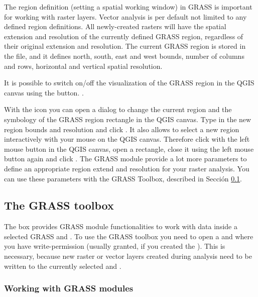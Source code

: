 The region definition (setting a spatial working window) in GRASS is important 
for working with raster layers. Vector analysis is per default not limited
to any defined region definitions. All newly-created rasters will have the
spatial extension and resolution of the currently defined GRASS region,
regardless of their original extension and resolution. The current GRASS
region is stored in the  file, and it 
defines north, south, east and west bounds, number of columns and rows, 
horizontal and vertical spatial resolution.

It is possible to switch on/off the visualization of the GRASS region in the
QGIS canvas using the 
button. .

With the  icon you 
can open a dialog to change the current region and the symbology of the GRASS 
region rectangle in the QGIS canvas. Type in the new region bounds and 
resolution and click . It also allows to select a new region 
interactively with your mouse on the QGIS canvas. Therefore click with the 
left mouse button in the QGIS canvas, open a rectangle, close it using the 
left mouse button again and click .
The GRASS module  provide a lot more parameters to define 
an appropriate region extend and resolution for your raster analysis. You can 
use these parameters with the GRASS Toolbox, described in Sección 
\ref{subsec:grass_toolbox}.

\subsection{The GRASS toolbox}\label{subsec:grass_toolbox}

The  box provides GRASS module 
functionalities to work with data inside a selected GRASS  
and . To use the GRASS toolbox you need to open a 
 and  where you have write-permission 
(usually granted, if you created the ). This is necessary, 
because new raster or vector layers created during analysis need to be written 
to the currently selected  and .

\subsubsection{Working with GRASS modules}

